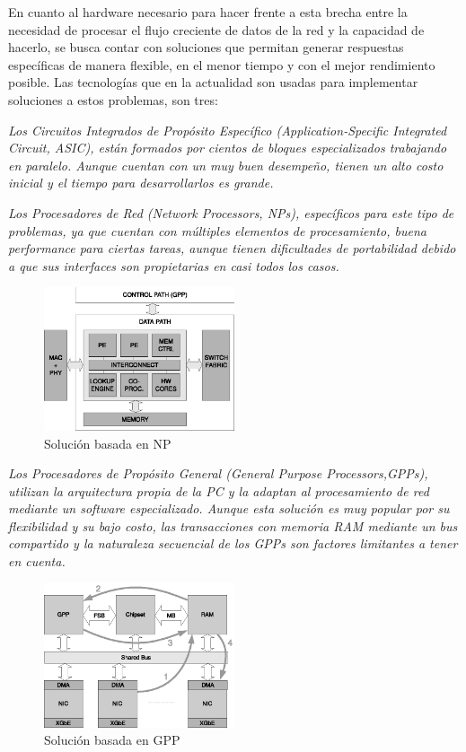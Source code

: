 En cuanto al hardware necesario para hacer frente a esta brecha entre la necesidad de procesar el flujo creciente de datos de la red y la capacidad de hacerlo, se busca contar con soluciones que permitan generar respuestas específicas de manera flexible, en el menor tiempo y con el mejor rendimiento posible. Las tecnologías que en la actualidad son usadas para implementar soluciones a estos problemas, son tres:

\emph{Los Circuitos Integrados de Propósito Específico (\textit{Application-Specific Integrated Circuit}, ASIC), están formados por cientos de bloques especializados trabajando en paralelo. Aunque cuentan con un muy buen desempeño, tienen un alto costo inicial y el tiempo para desarrollarlos es grande.}

\emph{Los Procesadores de Red (Network Processors, NPs), específicos para este tipo de problemas, ya que cuentan con múltiples elementos de procesamiento, buena performance para ciertas tareas, aunque tienen dificultades de portabilidad debido a que sus interfaces son propietarias en casi todos los casos.}
\begin{figure}[h]
  \centering
      \includegraphics[width=0.5\textwidth]{1-introduccion/graf/NP_based.eps}
  \caption{Solución basada en NP}
  \label{fig:diseno}
\end{figure}
\newpage

\emph{Los Procesadores de Propósito General (General Purpose Processors,GPPs), utilizan la arquitectura propia de la PC y la adaptan al procesamiento de red mediante un software especializado. Aunque esta solución es muy popular por su flexibilidad y su bajo costo, las transacciones con memoria RAM mediante un bus compartido y la naturaleza secuencial de los GPPs son factores limitantes a tener en cuenta. }
 \begin{figure}[h]
  \centering
      \includegraphics[width=0.5\textwidth]{1-introduccion/graf/GPP_based.eps}
  \caption{Solución basada en GPP}
  \label{fig:diseno}
\end{figure}

